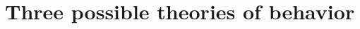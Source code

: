 \documentclass[10pt,letterpaper]{article}
\newcommand{\red}[1]{\textcolor{Red}{#1}}
\begin{document}













\section{Three possible theories of behavior}
\end{document}
